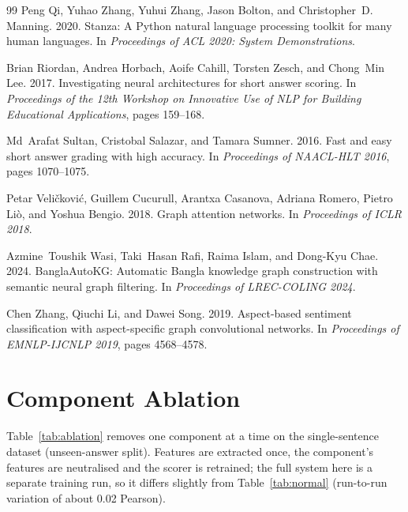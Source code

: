 \documentclass[10pt,a4paper,twocolumn]{article}
\begin{document}
\begin{thebibliography}{99}
Peng Qi, Yuhao Zhang, Yuhui Zhang, Jason Bolton, and Christopher~D. Manning. 2020.
\newblock Stanza: A Python natural language processing toolkit for many human languages.
\newblock In \emph{Proceedings of ACL 2020: System Demonstrations}.

Brian Riordan, Andrea Horbach, Aoife Cahill, Torsten Zesch, and Chong~Min Lee. 2017.
\newblock Investigating neural architectures for short answer scoring.
\newblock In \emph{Proceedings of the 12th Workshop on Innovative Use of NLP for Building Educational Applications}, pages 159--168.

Md~Arafat Sultan, Cristobal Salazar, and Tamara Sumner. 2016.
\newblock Fast and easy short answer grading with high accuracy.
\newblock In \emph{Proceedings of NAACL-HLT 2016}, pages 1070--1075.

Petar Veli{\v{c}}kovi{\'c}, Guillem Cucurull, Arantxa Casanova, Adriana Romero, Pietro Li{\`o}, and Yoshua Bengio. 2018.
\newblock Graph attention networks.
\newblock In \emph{Proceedings of ICLR 2018}.

Azmine~Toushik Wasi, Taki~Hasan Rafi, Raima Islam, and Dong-Kyu Chae. 2024.
\newblock BanglaAutoKG: Automatic Bangla knowledge graph construction with semantic neural graph filtering.
\newblock In \emph{Proceedings of LREC-COLING 2024}.

Chen Zhang, Qiuchi Li, and Dawei Song. 2019.
\newblock Aspect-based sentiment classification with aspect-specific graph convolutional networks.
\newblock In \emph{Proceedings of EMNLP-IJCNLP 2019}, pages 4568--4578.
\end{thebibliography}
\normalsize

\appendix
\section{Component Ablation}\label{app:ablation}
Table~\ref{tab:ablation} removes one component at a time on the
single-sentence dataset (unseen-answer split). Features are extracted once,
the component's features are neutralised and the scorer is retrained; the
full system here is a separate training run, so it differs slightly from
Table~\ref{tab:normal} (run-to-run variation of about 0.02 Pearson).
\end{document}
